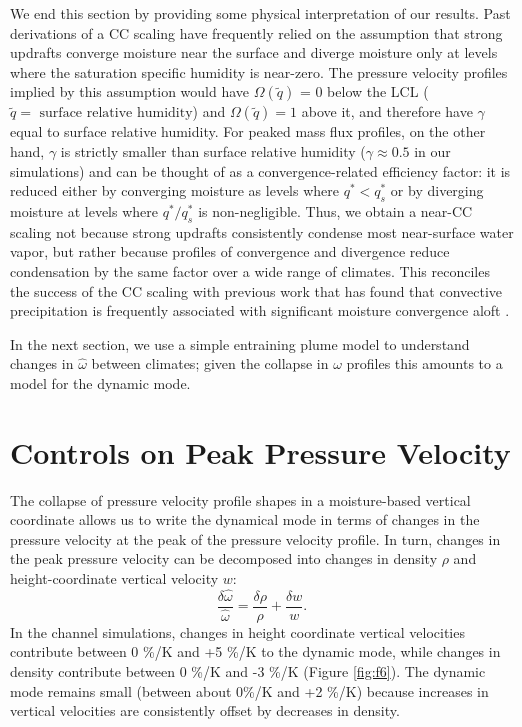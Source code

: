 \documentclass[twocol]{ametsoc}
\begin{document}
We end this section by providing some physical interpretation of our results. Past derivations of a CC scaling \citep[e.g.][]{OGorman2009TheChange,Muller2011IntensificationModel} have frequently relied on the assumption that strong updrafts converge moisture near the surface and diverge moisture only at levels where the saturation specific humidity is near-zero. The pressure velocity profiles implied by this assumption would have $\Omega(\tilde{q})$ = 0 below the LCL ($\tilde{q} = \textrm{ surface relative humidity}$) and $\Omega(\tilde{q}) = 1$ above it, and therefore have $\gamma$ equal to surface relative humidity. For peaked mass flux profiles, on the other hand, $\gamma$ is strictly smaller than surface relative humidity ($\gamma \approx 0.5$ in our simulations) and can be thought of as a convergence-related efficiency factor: it is reduced either by converging moisture as levels where $q^* < q^*_s$ or by diverging moisture at levels where $q^*/q^*_s$ is non-negligible. Thus, we obtain a near-CC scaling not because strong updrafts consistently condense most near-surface water vapor, but rather because profiles of convergence and divergence reduce condensation by the same factor over a wide range of climates. This reconciles the success of the CC scaling with previous work that has found that convective precipitation is frequently associated with significant moisture convergence aloft \citep{Moore2014AEffect}.

In the next section, we use a simple entraining plume model to understand changes in $\hat{\omega}$ between climates; given the collapse in $\omega$ profiles this amounts to a model for the dynamic mode.

\section{Controls on Peak Pressure Velocity} \label{sec:pprof}

The collapse of pressure velocity profile shapes in a moisture-based vertical coordinate allows us to write the dynamical mode in terms of changes in the pressure velocity at the peak of the pressure velocity profile. In turn, changes in the peak pressure velocity can be decomposed into changes in density $\rho$ and height-coordinate vertical velocity $w$:
\begin{equation*}
    \frac{\delta \hat{\omega}}{\hat{\omega}} = \frac{\delta \rho}{\rho} + \frac{\delta w}{w}.
\end{equation*}
In the channel simulations, changes in height coordinate vertical velocities contribute between 0 \%/K and +5 \%/K to the dynamic mode, while changes in density contribute between 0 \%/K and -3 \%/K (Figure \ref{fig:f6}). The dynamic mode remains small (between about 0\%/K and +2 \%/K) because increases in vertical velocities are consistently offset by decreases in density.
\end{document}
